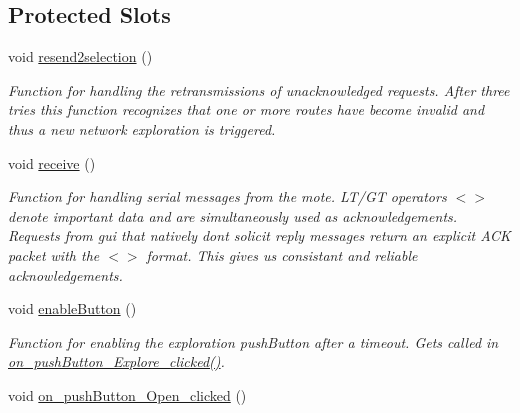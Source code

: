 \subsection*{Protected Slots}
\begin{DoxyCompactItemize}
\item 
\mbox{\label{classMainWindow_a0ed54c0c9e6d0206e716402ade3994ee}} 
void \hyperlink{classMainWindow_a0ed54c0c9e6d0206e716402ade3994ee}{resend2selection} ()
\begin{DoxyCompactList}\small\item\em Function for handling the retransmissions of unacknowledged requests. After three tries this function recognizes that one or more routes have become invalid and thus a new network exploration is triggered. \end{DoxyCompactList}\item 
\mbox{\label{classMainWindow_aa4a61b706dc1ac7eafed167da9fb6cc3}} 
void \hyperlink{classMainWindow_aa4a61b706dc1ac7eafed167da9fb6cc3}{receive} ()
\begin{DoxyCompactList}\small\item\em Function for handling serial messages from the mote. L\+T/\+GT operators $<$$>$ denote important data and are simultaneously used as acknowledgements. Requests from gui that natively don\textquotesingle{}t solicit reply messages return an explicit A\+CK packet with the $<$$>$ format. This gives us consistant and reliable acknowledgements. \end{DoxyCompactList}\item 
\mbox{\label{classMainWindow_aaaaabf5c6516ffee58d65f5fdf786c44}} 
void \hyperlink{classMainWindow_aaaaabf5c6516ffee58d65f5fdf786c44}{enable\+Button} ()
\begin{DoxyCompactList}\small\item\em Function for enabling the exploration push\+Button after a timeout. Gets called in \hyperlink{classMainWindow_a6de134a18b08532696095fad75d8b9e3}{on\+\_\+push\+Button\+\_\+\+Explore\+\_\+clicked()}. \end{DoxyCompactList}\item 
\mbox{\label{classMainWindow_a716f3b40c6e743d44cfcf9252b2a1934}} 
void \hyperlink{classMainWindow_a716f3b40c6e743d44cfcf9252b2a1934}{on\+\_\+push\+Button\+\_\+\+Open\+\_\+clicked} ()

\end{DoxyCompactItemize}
